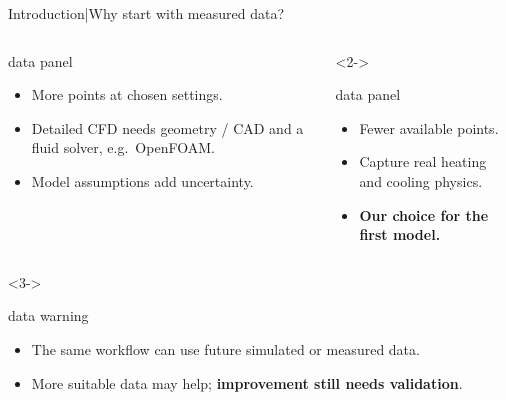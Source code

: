 \begin{frame}{Introduction\enspace|\enspace Why start with measured data?}
  \vspace*{\fill}
  \begin{columns}[T,onlytextwidth]
      \begin{beamercolorbox}[sep=2.5mm,wd=\linewidth]{data panel}
        \small
        \begin{itemize}
          \item More points at chosen settings.
          \item Detailed CFD needs geometry / CAD and a fluid solver, e.g.\ OpenFOAM.
          \item Model assumptions add uncertainty.
        \end{itemize}
      \end{beamercolorbox}
      \begin{uncoverenv}<2->
      \begin{beamercolorbox}[sep=2.5mm,wd=\linewidth]{data panel}
        \small
        \begin{itemize}
          \item Fewer available points.
          \item Capture real heating and cooling physics.
          \item \textbf{Our choice for the first model.}
        \end{itemize}
      \end{beamercolorbox}
      \end{uncoverenv}
  \end{columns}
  \par\vfill
  \begin{uncoverenv}<3->
  \begin{beamercolorbox}[sep=2mm,wd=\textwidth]{data warning}
    \small
    \begin{itemize}
      \setlength{\itemsep}{1pt}
      \item The same workflow can use future simulated or measured data.
      \item More suitable data may help; \textbf{improvement still needs validation}.
    \end{itemize}
  \end{beamercolorbox}
  \end{uncoverenv}
\end{frame}

